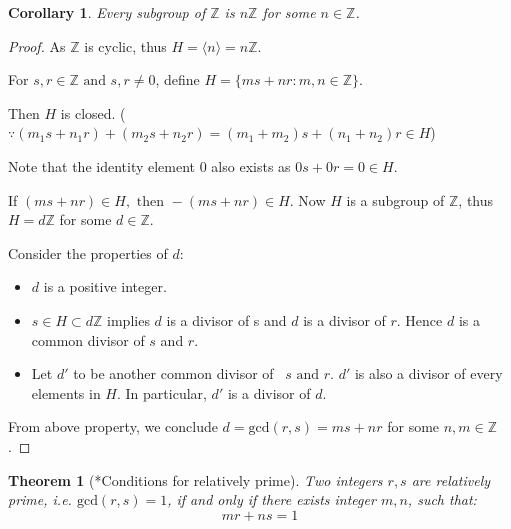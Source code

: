 \documentclass{article}
\theoremstyle{MyNonumberplain}
\theoremstyle{break}
\newtheorem*{proof}{Proof. }
\newcommand{\Z}{\mathbb{Z}}
\newcommand{\cyclic}[1]{\langle #1 \rangle}
\newcommand{\infixand}{\text{ and }}
\theoremstyle{break}
\newtheorem{theorem}{Theorem}[section]
\newtheorem{corollary}{Corollary}[theorem]
\theoremstyle{break}
\theoremstyle{definition}
\theoremstyle{break}
\begin{document}
\begin{thmbox}
    \begin{corollary}
        Every subgroup of $\Z$ is $n\Z$ for some $n\in\Z$.
    \end{corollary}
    \begin{prfbox}
        \begin{proof}
            As $\mathbb{Z}$ is cyclic, thus $H = \cyclic{n} = n\mathbb{Z}$.\bigskip
    
            For $s, r \in \mathbb{Z} \infixand s, r \neq 0$, define $H = \{ m s + n r : m,n \in \mathbb{Z} \}$.\bigskip

            Then $H$ is closed. ($\because (m_1 s + n_1 r) + (m_2 s + n_2 r) = (m_1 + m_2) s + (n_1 + n_2) r
            \in H$)\bigskip
    
            Note that the identity element 0 also exists as $0 s + 0 r = 0 \in H$.\bigskip
    
            If $(m s + n r) \in H, \text{ then } - (m s + n r) \in H$. Now $H$ is a
            subgroup of $\mathbb{Z}$, thus $H = d\mathbb{Z}$ for some $d \in \mathbb{Z}$.\bigskip
    
            Consider the properties of $d$:\bigskip

            \begin{itemize}
            \item $d$ is a positive integer.\bigskip
            
            \item $s \in H \subset d\mathbb{Z}$ implies $d$ is a divisor of s and $d$ is
            a divisor of $r$. Hence $d$ is a common divisor of $s$ and $r$.\bigskip
            
            \item Let $d'$ to be another common divisor of \ $s \infixand r$. $d'$ is
            also a divisor of every elements in $H$. In particular, $d'$ is a divisor of $d$.\bigskip
            \end{itemize}
            From above property, we conclude $d = \text{gcd} (r, s) = m s + n r$ for
            some $n, m \in \mathbb{Z}$.
        \end{proof}
    \end{prfbox}
\end{thmbox}

\begin{thmbox}
    \begin{theorem}[*Conditions for relatively prime]
        Two integers $r,s$ are relatively prime, i.e. $\text{gcd}(r,s)=1$, if and only if there exists integer $m,n$, such that:
        $$mr+ns=1$$
    \end{theorem}
\end{thmbox}
\end{document}
